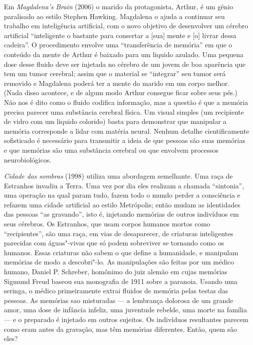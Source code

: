 Em \emph{Magdalena's Brain} (2006) o marido da protagonista, Arthur, é
um gênio paralisado ao estilo Stephen Hawking. Magdalena o ajuda a
continuar seu trabalho em inteligência artificial, com o novo objetivo
de desenvolver um cérebro artificial ``inteligente o bastante para
consertar a {[}sua{]} mente e {[}o{]} livrar dessa cadeira''. O
procedimento envolve uma ``transferência de memória'' em que o conteúdo
da mente de Arthur é baixado para um liquido azulado. Uma pequena dose
desse fluido deve ser injetada no cérebro de um jovem de boa aparência
que tem um tumor cerebral; assim que o material se ``integrar'' seu
tumor será removido e Magdalena poderá ter a mente do marido em um corpo
melhor. (Nada disso acontece, e de algum modo Arthur consegue ficar
sobre seus pés.) Não nos é dito como o fluido codifica informação, mas a
questão é que a memória precisa parecer uma substância cerebral física.
Um visual simples (um recipiente de vidro com um liquido colorido) basta
para demonstrar que manipular a memória corresponde a lidar com matéria
neural. Nenhum detalhe cientificamente sofisticado é necessário para
transmitir a ideia de que pessoas são suas memórias e que memórias são
uma substância cerebral ou que envolvem processos neurobiológicos.

\emph{Cidade das sombras} (1998) utiliza uma abordagem semelhante. Uma
raça de Estranhos invadiu a Terra. Uma vez por dia eles realizam a
chamada ``sintonia'', uma operação na qual param tudo, fazem todo o
mundo perder a consciência e refazem uma cidade artificial ao estilo
Metrópolis; então mudam as identidades das pessoas ``as gravando'', isto
é, injetando memórias de outros indivíduos em seus cérebros. Os
Estranhos, que usam corpos humanos mortos como ``recipientes'', são uma
raça, em vias de desaparecer, de criaturas inteligentes parecidas com
águas"-vivas que só podem sobreviver se tornando como os humanos. Essas
criaturas não sabem o que define a humanidade, e manipulam memórias de
modo a descobri"-lo. As manipulações são feitas por um médico humano,
Daniel P. Schreber, homônimo do juiz alemão em cujas memórias Sigmund
Freud baseou sua monografia de 1911 sobre a paranoia. Usando uma
seringa, o médico primeiramente extrai fluidos de memória pelas testas
das pessoas. As memórias sao misturadas --- a lembrança dolorosa de um
grande amor, uma dose de infância infeliz, uma juventude rebelde, uma
morte na família --- e o preparado é injetado em outros sujeitos. Os
indivíduos resultantes parecem como eram antes da gravação, mas têm
memórias diferentes. Então, quem são eles?


